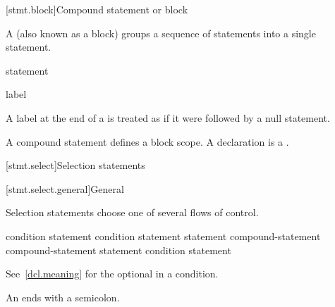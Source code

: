[stmt.block]{Compound statement or block}%
%

\pnum
A  (also known as a block) groups a
sequence of statements into a single statement.

\begin{bnf}
\br
    \terminal{\{}   \terminal{\}}
\end{bnf}

\begin{bnf}
\br
    statement 
\end{bnf}

\begin{bnf}
\br
    label 
\end{bnf}

A label at the end of a 
is treated as if it were followed by a null statement.

\pnum
\begin{note}
A compound statement defines a block scope.
A declaration is a .
\end{note}

[stmt.select]{Selection statements}%

[stmt.select.general]{General}%

\pnum
Selection statements choose one of several flows of control.

%
%
%
\begin{bnf}
\br
      \terminal{(}  condition \terminal{)} statement\br
      \terminal{(}  condition \terminal{)} statement  statement\br
     \opt{\terminal{!}}  compound-statement\br
     \opt{\terminal{!}}  compound-statement  statement\br
     \terminal{(}  condition \terminal{)} statement
\end{bnf}

See~\ref{dcl.meaning} for the optional  in a condition.
\begin{note}
An  ends with a semicolon.
\end{note}

